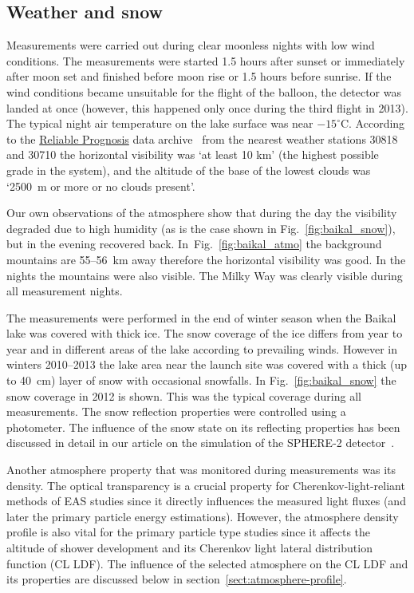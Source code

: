 \documentclass[final,5p,times,twocolumn]{elsarticle}
\begin{document}
\subsection{Weather and snow}

Measurements were carried out during clear moonless nights with low wind conditions. The measurements were started 1.5 hours after sunset or immediately after moon set and finished before moon rise or 1.5 hours before sunrise. If the wind conditions became unsuitable for the flight of the balloon, the detector was landed at once (however, this happened only once during the third flight in 2013). The typical night air temperature on the lake surface was near $-15^\circ$C. According to the \href{https://rp5.ru/Weather_in_the_world}{Reliable Prognosis} data archive~\cite{rp5} from the nearest weather stations 30818 and 30710 the horizontal visibility was `at least 10 km' (the highest possible grade in the system), and the altitude of the base of the lowest clouds was `2500~m or more or no clouds present'.

Our own observations of the atmosphere show that during the day the visibility degraded due to high humidity (as is the case shown in Fig.~\ref{fig:baikal_snow}), but in the evening recovered back. In~Fig.~\ref{fig:baikal_atmo} the background mountains are 55--56~km away therefore the horizontal visibility was good. In the nights the mountains were also visible. The Milky Way was clearly visible during all measurement nights. 

The measurements were performed in the end of winter season when the Baikal lake was covered with thick ice. The snow coverage of the ice differs from year to year and in different areas of the lake according to prevailing winds. However in winters 2010--2013 the lake area near the launch site was covered with a thick (up to 40~cm) layer of snow with occasional snowfalls. In Fig.~\ref{fig:baikal_snow} the snow coverage in 2012 is shown. This was the typical coverage during all measurements. The snow reflection properties were controlled using a photometer. The influence of the snow state on its reflecting properties has been discussed in detail in our article on the simulation of the SPHERE-2 detector~\cite{Ant19}.

Another atmosphere property that was monitored during measurements was its density. The optical transparency is a crucial property for Cherenkov-light-reliant methods of EAS studies since it directly influences the measured light fluxes (and later the primary particle energy estimations). However, the atmosphere density profile is also vital for the primary particle type studies since it affects the altitude of shower development and its Cherenkov light lateral distribution function (CL LDF). The influence of the selected atmosphere on the CL LDF and its properties are discussed below in section~\ref{sect:atmosphere-profile}.
\end{document}
